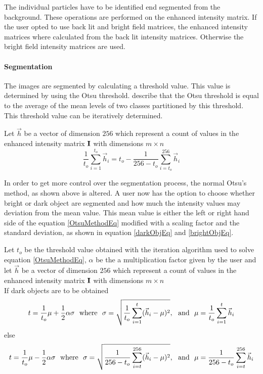The individual particles have to be identified end segmented from the background. These operations are performed on the enhanced intensity matrix. If the user opted to use back lit and bright field matrices, the enhanced intensity matrices where calculated from the back lit intensity matrices. Otherwise the bright field intensity matrices are used.

\paragraph{Segmentation}
The images are segmented by calculating a threshold value. This value is determined by using the Otsu threshold. \citeauthor{Xu2011956} \cite{Xu2011956} describe that the Otsu threshold is equal to the average of the mean levels of two classes partitioned by this threshold. This threshold value can be iteratively determined.

\begin{sBox}
	Let $\vec{h}$ be a vector of dimension $256$ which represent a count of values in the enhanced intensity matrix $\mat{I}$ with dimensions $m \times n$
	\begin{equation}\label{OtsuMethodEq}
		\frac{1}{t_o}\sum\limits_{i=1}^{t_o} \vec{h}_i = t_o - \frac{1}{256 - t_o}\sum\limits_{i=t_o}^{256} \vec{h}_i
	\end{equation}
\end{sBox}

In order to get more control over the segmentation process, the normal Otsu's method, as shown above is altered. A user now has the option to choose whether bright or dark object are segmented and how much the intensity values may deviation from the mean value. This mean value is either the left or right hand side of the equation \ref{OtsuMethodEq} modified with a scaling factor and the standard deviation, as shown in equation \ref{darkObjEq} and \ref{brightObjEq}.
\begin{sBox}
	Let $ t_o $ be the threshold value obtained with the iteration algorithm used to solve equation \ref{OtsuMethodEq}, $ \alpha $ be the a multiplication factor given by the user and let $\vec{h}$ be a vector of dimension $256$ which represent a count of values in the enhanced intensity matrix $\mat{I}$ with dimensions $m \times n$\\	
	If dark objects are to be obtained
	\begin{equation}\label{darkObjEq}
		t = \frac{1}{t_o}\mu + \frac{1}{2}\alpha\sigma {\rm \ \ where\ \ }\sigma = \sqrt{\frac{1}{t_o} \sum\limits_{i=1}^t (\vec{h}_i - \mu)^2}, {\rm \ \ and\ \ } \mu = \frac{1}{t_o} \sum\limits_{i=1}^t \vec{h}_i
	\end{equation}
	 else
	 \begin{equation}\label{brightObjEq}
	 	t = \frac{1}{t_o}\mu - \frac{1}{2}\alpha\sigma {\rm \ \ where\ \ }\sigma = \sqrt{\frac{1}{256 - t_o} \sum\limits_{i=t}^{256} (\vec{h}_i - \mu)^2}, {\rm \ \ and\ \ } \mu = \frac{1}{256 - t_o} \sum\limits_{i=t}^{256} \vec{h}_i
	 \end{equation} 
\end{sBox}


